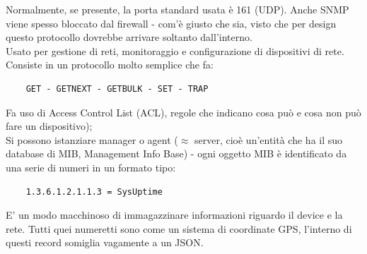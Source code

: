\noindent Normalmente, se presente, la porta standard usata è 161 (UDP). Anche SNMP viene spesso bloccato dal firewall - com'è giusto che sia, visto che per design questo protocollo dovrebbe arrivare soltanto dall'interno.\\

\noindent Usato per gestione di reti, monitoraggio e configurazione di dispositivi di rete.\\

\noindent Consiste in un protocollo molto semplice che fa:
\begin{verbatim}
    GET - GETNEXT - GETBULK - SET - TRAP
\end{verbatim}

\noindent Fa uso di Access Control List (ACL), regole che indicano cosa può e cosa non può fare un dispositivo);\\

\noindent Si possono istanziare manager o agent ($\approx$ server, cioè un'entità che ha il suo database di MIB, Management Info Base) - ogni oggetto MIB è identificato da una serie di numeri in un formato tipo:
\begin{verbatim}
    1.3.6.1.2.1.1.3 = SysUptime
\end{verbatim}

\noindent E' un modo macchinoso di immagazzinare informazioni riguardo il device e la rete. Tutti quei numeretti sono come un sistema di coordinate GPS, l'interno di questi record somiglia vagamente a un JSON.
\newpage